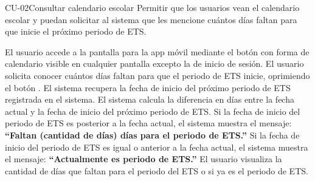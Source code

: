 
\label{CU-02}
\begin{UseCase}{CU-02}{Consultar calendario escolar}{
		Permitir que los usuarios vean el calendario escolar y puedan solicitar al sistema que les mencione cuántos días faltan para que inicie el próximo periodo de ETS.
	}
\end{UseCase}

\begin{UCtrayectoria}
	\UCpaso[\UCactor] El usuario accede a la pantalla  para la app móvil mediante el botón con forma de calendario visible en cualquier pantalla excepto la de inicio de sesión\label{CU02.accedePantalla}.
	\UCpaso[\UCactor] El usuario solicita conocer cuántos días faltan para que el periodo de ETS inicie, oprimiendo el botón .
	\UCpaso El sistema recupera la fecha de inicio del próximo periodo de ETS registrada en el sistema.
	\UCpaso El sistema calcula la diferencia en días entre la fecha actual y la fecha de inicio del próximo periodo de ETS.
	\UCpaso Si la fecha de inicio del periodo de ETS es posterior a la fecha actual, el sistema muestra el mensaje: \textbf{ ``Faltan (cantidad de días) días para el periodo de ETS.''}
	\UCpaso Si la fecha de inicio del periodo de ETS es igual o anterior a la fecha actual, el sistema muestra el mensaje: \textbf{ ``Actualmente es periodo de ETS.''}
	\UCpaso [\UCactor] El usuario visualiza la cantidad de días que faltan para el periodo del ETS o si ya es el periodo de ETS.
\end{UCtrayectoria}







